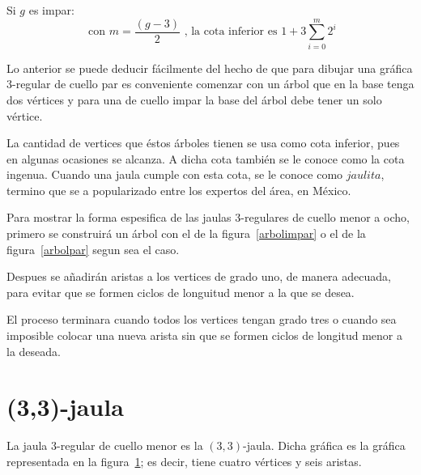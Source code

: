 \documentclass[12pt]{book}
\theoremstyle{definition}
\begin{document}
Si $g$ es impar:
\begin{equation*}
  \text{ con } m=\frac{(g-3)}{2} \text{ , la cota inferior es } 1 + 3\sum^m_{i=0} 2^i
\end{equation*}

Lo anterior se puede deducir fácilmente del hecho de que para dibujar
una gráfica 3-regular de cuello par es conveniente comenzar con un árbol que en
la base tenga dos vértices y para una de cuello impar la base del
árbol debe tener un solo vértice. 

La cantidad de vertices que éstos
árboles tienen se usa como cota inferior, pues en algunas ocasiones se alcanza.
A dicha cota también se le conoce como la cota ingenua. Cuando una jaula cumple con esta cota, se le conoce como
$jaulita$, termino que se a popularizado entre los
expertos del área, en México.


Para mostrar la forma espesifica de las jaulas $3$-regulares de cuello
menor a ocho, primero se construirá un árbol con el de la
figura~\ref{arbolimpar} o el de la figura~\ref{arbolpar} segun sea el
caso.
 
Despues se añadirán aristas a los vertices de grado uno, de manera
adecuada, para evitar que se formen ciclos de longuitud menor a la que
se desea. 

El proceso terminara cuando todos los vertices tengan grado
tres o cuando sea imposible colocar una nueva arista sin que se formen
ciclos de longitud menor a la deseada.


\section{(3,3)-jaula}

La jaula $3$-regular de cuello menor es la $(3,3)$-jaula. Dicha gráfica es la gráfica representada en la figura~\ref{jaula(3,3)}; es decir, tiene cuatro vértices y seis aristas.

\begin{figure}[htb]
  \centering
  \caption{} \label{jaula(3,3)}
\end{figure}
\end{document}
